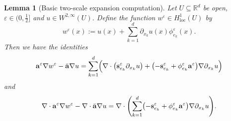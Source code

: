 \documentclass[11pt]{article} %
\numberwithin{equation}{section}
\newtheorem{lemma}[theorem]{Lemma}
\theoremstyle{definition}
\let\originalleft\left
\let\originalright\right
\renewcommand{\left}{\mathopen{}\mathclose\bgroup\originalleft}
\renewcommand{\right}{\aftergroup\egroup\originalright}
\newcommand*{\R}{\ensuremath{\mathbb{R}}}
\newcommand*{\Rd}{\ensuremath{\mathbb{R}^d}}
\newcommand{\eps}{\varepsilon}
\newcommand{\qand}{\quad \mbox{and} \quad }
\newcommand{\s}{\mathbf{s}}
\newcommand{\ep}{\eps}
\renewcommand{\a}{\mathbf{a}}
\newcommand{\ahom}{\bar{\a}}
\begin{document}
\begin{lemma}[Basic two-scale expansion computation]
\label{l.twoscale}
Let $U\subseteq \Rd$ be open, $\ep \in \bigl(0,\tfrac12\big]$ and $u\in W^{2,\infty}(U)$. 
Define the function $w^\ep \in H^1_{\mathrm{loc}}(U)$ by
\begin{equation}
\label{e.twoscale.wep}
w^\ep (x) 
:= 
u(x) + \sum_{k=1}^d \partial_{x_k}u(x) \phi_{e_k}^\ep(x). 
\end{equation}
Then we have the identities
\begin{equation}
\label{e.twoscale.flux}
\a^\ep \nabla w^\ep - \ahom\nabla u
=
\sum_{k=1}^d \Bigl( 
\nabla \cdot \left( \s^\ep_{e_k}  \partial_{x_k} u  \right)
+
\bigl( - \s^\ep_{e_k} + \phi_{e_k}^\ep \a^\ep \bigr) \nabla \partial_{x_k} u
\Bigr)
\end{equation}
and
\begin{align}
\label{e.twoscale.error}
\nabla \cdot \a^\ep \nabla w^\ep 
-
\nabla\cdot \ahom \nabla u
= 
\nabla\cdot \left( \sum_{k=1}^d 
\left(
- \s_{e_k}^\ep 
+
\phi_{e_k}^\ep \a^\ep 
\right) \nabla \partial_{x_k} u \right).
\end{align}
\end{lemma}
\end{document}
